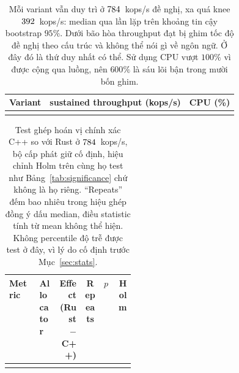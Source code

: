 \begin{table}[H]
\centering
\small
\caption[Mỗi variant vẫn duy trì gì qua bão hòa]{Mỗi variant vẫn duy trì ở
$784$~kops/s đề nghị, xa quá knee $392$~kops/s: median qua
\NRepeats{} lần lặp trên khoảng tin cậy bootstrap $95\%$. Dưới bão hòa throughput đạt
bị ghim tốc độ đề nghị theo cấu trúc và không thể nói gì về
ngôn ngữ. Ở đây đó là thứ duy nhất có thể. Sử dụng CPU vượt $100\%$ vì được
cộng qua luồng, nên $600\%$ là sáu lõi bận trong mười bốn
ghim.\label{tab:overload}}
\begin{tabular}{@{}l r r@{}}
\hline\hline
Variant & sustained throughput (kops/s) & CPU (\%) \\
\hline
\\
\hline
\end{tabular}
\end{table}

\begin{table}[H]
\centering
\small
\caption[Test ghép chính xác qua bão hòa]{Test ghép hoán vị chính xác C++ so với Rust ở
$784$~kops/s, bộ cấp phát giữ cố định, hiệu chỉnh Holm trên cùng họ
\NTests{} test như Bảng~\ref{tab:significance} chứ không là họ riêng. ``Repeats''
đếm bao nhiêu trong \NRepeats{} hiệu ghép đồng ý dấu median, điều statistic tính từ mean không thể hiện. Không percentile độ trễ được test ở đây, vì
lý do cố định trước Mục~\ref{sec:stats}.\label{tab:overloadtest}}
\setlength{\tabcolsep}{4pt}
\begin{tabular}{@{}p{0.24\linewidth} l r c r r@{}}
\hline\hline
Metric & Allocator & Effect (Rust $-$ C++) & Repeats & $p$ & Holm \\
\hline
\\
\hline
\end{tabular}
\end{table}
